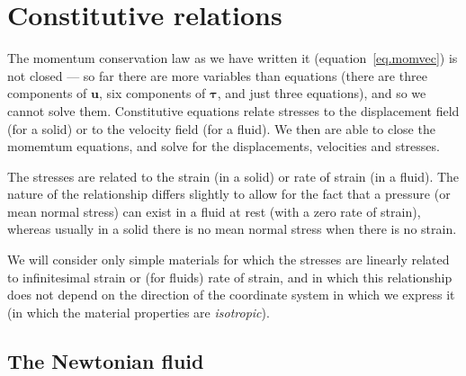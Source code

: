 \documentclass[a4paper,11pt]		{report}
\begin{document}
\chapter{Constitutive relations}
\label{ch.constit}

The momentum conservation law as we have written it
(equation~\ref{eq.momvec}) is not closed --- so far there are more
variables than equations (there are three components of $\bm{u}$, six
components of $\bm{\tau}$, and just three equations), and so we cannot
solve them.  Constitutive equations relate stresses to the
displacement field (for a solid) or to the velocity field (for a
fluid). We then are able to close the momemtum equations, and solve
for the displacements, velocities and stresses.

The stresses are related to the strain (in a solid) or rate of strain
(in a fluid). The nature of the relationship differs slightly to allow
for the fact that a pressure (or mean normal stress) can exist in a
fluid at rest (\ie with a zero rate of strain), whereas usually in a
solid there is no mean normal stress when there is no strain.

We will consider only simple materials for which the stresses are
linearly related to infinitesimal strain or (for fluids) rate of
strain, and in which this relationship does not depend on the
direction of the coordinate system in which we express it (\ie in
which the material properties are \emph{isotropic}).

\section{The Newtonian fluid}
\end{document}
